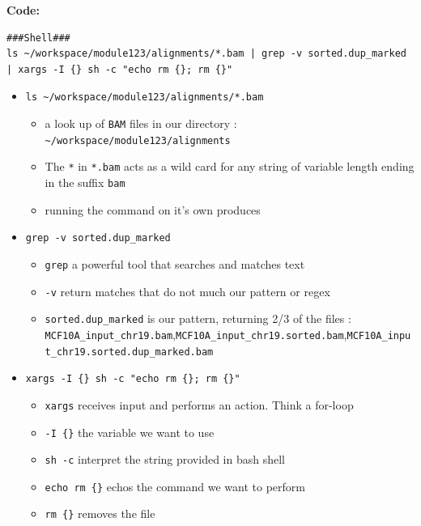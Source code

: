 \documentclass[
]{book}
\providecommand{\tightlist}{%
  \setlength{\itemsep}{0pt}\setlength{\parskip}{0pt}}
\begin{document}
\textbf{Code:}

\begin{verbatim}
###Shell###
ls ~/workspace/module123/alignments/*.bam | grep -v sorted.dup_marked | xargs -I {} sh -c "echo rm {}; rm {}"
\end{verbatim}

\begin{itemize}
\tightlist
\item
  \texttt{ls\ \textasciitilde{}/workspace/module123/alignments/*.bam}

  \begin{itemize}
  \tightlist
  \item
    a look up of \texttt{BAM} files in our directory : \texttt{\textasciitilde{}/workspace/module123/alignments}
  \item
    The \texttt{*} in \texttt{*.bam} acts as a wild card for any string of variable length ending in the suffix \texttt{bam}
  \item
    running the command on it's own produces
  \end{itemize}
\item
  \texttt{grep\ -v\ sorted.dup\_marked}

  \begin{itemize}
  \tightlist
  \item
    \texttt{grep} a powerful tool that searches and matches text
  \item
    \texttt{-v} return matches that do not much our pattern or regex
  \item
    \texttt{sorted.dup\_marked} is our pattern, returning 2/3 of the files : \texttt{MCF10A\_input\_chr19.bam},\texttt{MCF10A\_input\_chr19.sorted.bam},\texttt{MCF10A\_input\_chr19.sorted.dup\_marked.bam}
  \end{itemize}
\item
  \texttt{xargs\ -I\ \{\}\ sh\ -c\ "echo\ rm\ \{\};\ rm\ \{\}"}

  \begin{itemize}
  \tightlist
  \item
    \texttt{xargs} receives input and performs an action. Think a for-loop
  \item
    \texttt{-I\ \{\}} the variable we want to use
  \item
    \texttt{sh\ -c} interpret the string provided in bash shell
  \item
    \texttt{echo\ rm\ \{\}} echos the command we want to perform
  \item
    \texttt{rm\ \{\}} removes the file
  \end{itemize}
\end{itemize}
\end{document}
